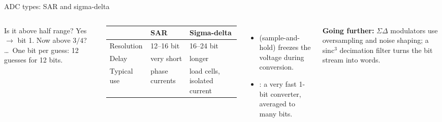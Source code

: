 \documentclass[aspectratio=169,10pt]{beamer}
\newcommand{\gofurther}[1]{{\footnotesize\color{mkGray}\textbf{\color{mkMid}Going further:} #1}}
\begin{document}
\begin{frame}{ADC types: SAR and sigma-delta}
\begin{columns}[T]
\centering
{}

\vspace{2mm}
\begin{keybox}[SAR = ``guess the number'']
\small Is it above half range? Yes $\to$ bit 1. Now above $3/4$? \dots\ One bit per guess: 12 guesses for 12 bits.
\end{keybox}
\small
\renewcommand{\arraystretch}{1.12}
\begin{tabularx}{\linewidth}{@{}l X X@{}}
\toprule
 & \textbf{SAR} & \textbf{Sigma-delta}\\
\midrule
Resolution & 12--16 bit & 16--24 bit\\
Delay & \textcolor{mkGreen}{very short} & \textcolor{mkRed}{longer}\\
Typical use & phase currents & load cells, isolated current\\
\bottomrule
\end{tabularx}

\vspace{2mm}
\begin{itemize}\small
\item {} (sample-and-hold) freezes the voltage during conversion.
\item {}: a very fast 1-bit converter, averaged to many bits.
\end{itemize}
\gofurther{$\Sigma\Delta$ modulators use oversampling and noise shaping; a sinc$^3$ decimation filter turns the bit stream into words.}
\end{columns}
\end{frame}
\end{document}

